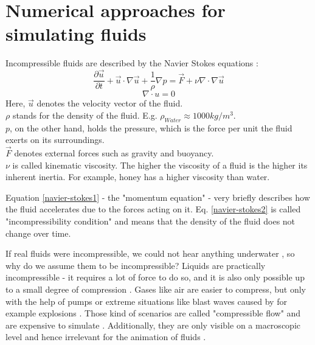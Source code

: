 \chapter{Numerical approaches for simulating fluids}\label{chapter:theoretical-background}

Incompressible fluids are described by the Navier Stokes equations \parencite{navier1827memoire} \parencite{stokes1880theories}:\\
\begin{equation} \label{navier-stokes1}
    \frac{\partial \vec{u}}{\partial t} + \vec{u} \cdot \nabla \vec{u} + \frac{1}{\rho}  \nabla p = \vec{F} + \nu \nabla \cdot \nabla \vec{u}
\end{equation}
\begin{equation} \label{navier-stokes2}
    \nabla \cdot u = 0
\end{equation}
Here, $\vec{u}$ denotes the velocity vector of the fluid.\\
$\rho$ stands for the density of the fluid. E.g. $\rho_{Water} \approx 1000 kg/m^3$. \\
$p$, on the other hand, holds the pressure, which is the force per unit the fluid exerts on its surroundings.\\
$\vec{F}$ denotes external forces such as gravity and buoyancy.\\
$\nu$ is called kinematic viscosity. The higher the viscosity of a fluid is the higher its inherent inertia. For example, honey has a higher viscosity than water.\\
\par Equation \ref{navier-stokes1} - the "momentum equation" - very briefly describes how the fluid accelerates due to the forces acting on it. Eq. \ref{navier-stokes2} is called "incompressibility condition" and means that the density of the fluid does not change over time.
\par If real fluids were incompressible, we could not hear anything underwater \parencite{urick1967principles}, so why do we assume them to be incompressible? Liquids are practically incompressible - it requires a lot of force to do so, and it is also only possible up to a small degree of compression \parencite{kell1975density}. Gases like air are easier to compress, but only with the help of pumps \parencite{burenga1978portable} or extreme situations like blast waves caused by for example explosions \parencite{taylor1950formation} \parencite{taylor1950formation2}. Those kind of scenarios are called "compressible flow" and are expensive to simulate \parencite{poinsot1992boundary}. Additionally, they are only visible on a macroscopic level and hence irrelevant for the animation of fluids \parencite{bridson2015fluid}.
